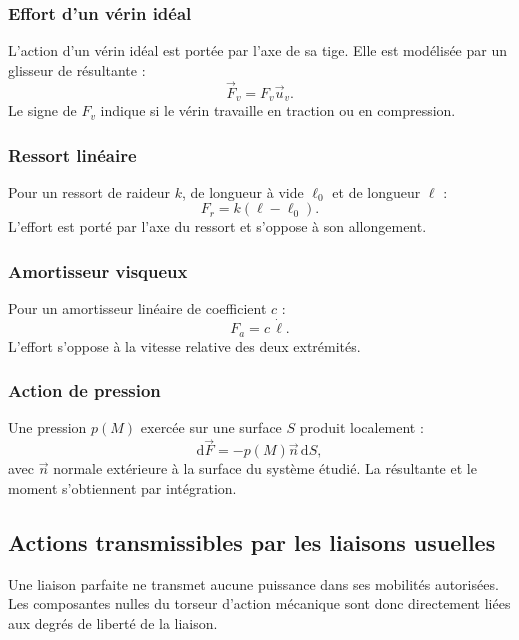 \subsubsection{Effort d'un vérin idéal}

L'action d'un vérin idéal est portée par l'axe de sa tige. Elle est modélisée par un glisseur de résultante :
\[
\vec F_v=F_v\vec u_v.
\]
Le signe de $F_v$ indique si le vérin travaille en traction ou en compression.

\subsubsection{Ressort linéaire}

Pour un ressort de raideur $k$, de longueur à vide $\ell_0$ et de longueur $\ell$ :
\[
F_r=k(\ell-\ell_0).
\]
L'effort est porté par l'axe du ressort et s'oppose à son allongement.

\subsubsection{Amortisseur visqueux}

Pour un amortisseur linéaire de coefficient $c$ :
\[
F_a=c\,\dot\ell.
\]
L'effort s'oppose à la vitesse relative des deux extrémités.

\subsubsection{Action de pression}

Une pression $p(M)$ exercée sur une surface $S$ produit localement :
\[
\mathrm d\vec F=-p(M)\vec n\,\mathrm dS,
\]
avec $\vec n$ normale extérieure à la surface du système étudié. La résultante et le moment s'obtiennent par intégration.

\subsection{Actions transmissibles par les liaisons usuelles}

Une liaison parfaite ne transmet aucune puissance dans ses mobilités autorisées. Les composantes nulles du torseur d'action mécanique sont donc directement liées aux degrés de liberté de la liaison.

